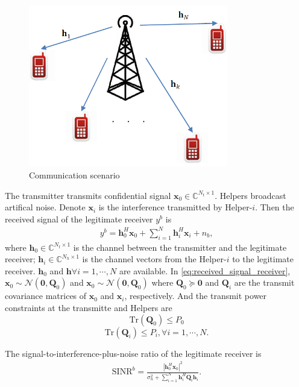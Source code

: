 \documentclass[journal]{IEEEtran}
\begin{document}
\begin{figure}[!htbp]
	\centering
	\includegraphics[width=8.7cm]{system.png} %
	\caption{Communication scenario}
	\label{fig:system}
\end{figure}

The transmitter transmits confidential signal  $\mathbf{x}_0 \in \mathbb{C}^{N_t \times 1}$. Helpers broadcast artifical noise. Denote $\mathbf{x}_i$ is the interference transmitted by Helper-$i$. Then the received signal of the legitimate receiver $y^b$ is
\begin{eqnarray} \label{eq:received_signal_receiver}
y^b =\mathbf{h}_{0}^{H}\mathbf{x}_0 + \sum_{i=1}^N \mathbf{h}_{i}^H\mathbf{x}_{i} + n_b,
\end{eqnarray}
where $\mathbf{h}_0 \in \mathbb{C}^{N_t \times 1}$ is the channel between the transmitter and the legitimate receiver; $\mathbf{h}_i \in \mathbb{C}^{N_h \times 1}$ is the channel vectors from the Helper-$i$ to the legitimate receiver. $\mathbf{h}_0$ and $\mathbf{h} \forall i = 1,\cdots,N$ are available. In \eqref{eq:received_signal_receiver}, $\mathbf{x}_0 \sim \mathcal{N}(\mathbf{0}, \mathbf{Q}_0)$ and $\mathbf{x}_0 \sim \mathcal{N}(\mathbf{0}, \mathbf{Q}_0)$ where $\mathbf{Q}_0 \succeq \mathbf{0}$ and $\mathbf{Q}_i$ are the transmit covariance matrices of $\mathbf{x}_0$ and $\mathbf{x}_i$, respectively. And the transmit power constraints at the transmitte and Helpers are
\begin{equation}
\text{Tr}\left(\mathbf{Q}_0\right)\leq P_0
\end{equation} 
\begin{equation}
\text{Tr}\left(\mathbf{Q}_i\right) \leq P_i, \forall i = 1,\cdots,N.
\end{equation} 

The signal-to-interference-plus-noise ratio of the legitimate receiver is
\begin{eqnarray} \label{eq:SINR of Bob}
\mathrm{SINR}^b = \frac{\left| \mathbf{h}_{0}^H\mathbf{x}_{0}\right|^2}{\sigma_n^2 + \sum_{i=1}^{N}\mathbf{h}_{i}^H\mathbf{Q}_{i}\mathbf{h}_i}.
\end{eqnarray}
\end{document}
